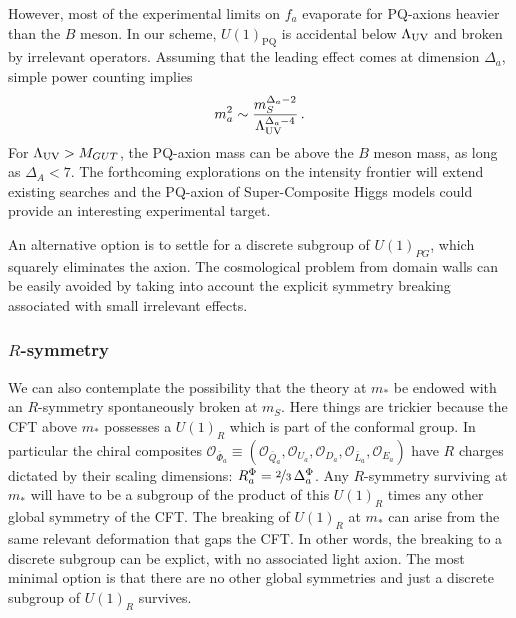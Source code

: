 \documentclass[a4paper,12pt]{article}
\newcommand{\be}{\begin{equation}}
\newcommand{\ee}{\end{equation}}
\def\O{\mathcal{O}}
\def\LUV{\Lambda_{\rm UV}}
\def\mS{m_S}
\begin{document}
{{{{However, most of the experimental limits on $f_a$ evaporate for PQ-axions heavier than the $B$ meson. In our scheme, $U(1)_{\textrm{PQ}}$ is accidental
below $\LUV$ and broken by irrelevant operators. Assuming that the leading effect comes  at dimension  $\Delta_{a}$, simple power counting implies 
\be
m_a^2 \sim \frac{\mS^{\Delta_a-2}}{\LUV^{\Delta_a-4}}\, .
\ee
For $\LUV> M_{GUT}$, the PQ-axion mass can be above the $B$ meson mass, as long as
$\Delta_A< 7$. The forthcoming explorations on the intensity frontier will extend existing searches and the PQ-axion of Super-Composite Higgs models could provide an interesting experimental target.

An alternative option is to settle for a discrete subgroup of $U(1)_{PG}$, which squarely eliminates the axion. The cosmological problem from domain walls can be easily avoided by taking into account the explicit symmetry breaking associated with small irrelevant effects.

\boldmath
 \subsubsection*{$R$-symmetry} 
 \unboldmath
 
We can also contemplate the possibility that the theory at $m_*$ be endowed with an $R$-symmetry spontaneously broken at $m_S$. Here things are trickier because the CFT above 
$m_*$ possesses a $U(1)_R$ which is part of the conformal group. In particular the chiral composites $\O_{{\bar \Phi}_a}\equiv (\O_{{\bar Q}_a},\O_{{U}_a},\O_{{D}_a}, \O_{{\bar L}_a}, \O_{{E}_a})$ have $R$ charges dictated by their scaling dimensions: $R^\Phi_a =\nicefrac{2}{3}\, \Delta^\Phi_a $. Any $R$-symmetry surviving at $m_*$ will have to be a subgroup of the product of this $U(1)_R$ times any other global symmetry of the CFT. The breaking of $U(1)_R$  at $m_*$ can arise from the same relevant deformation that gaps the CFT. In other words, the breaking to a discrete subgroup can be explict, with no associated light axion.
The most minimal option is that there are no other global symmetries and just a discrete subgroup of $U(1)_R$ survives. 

}}}}
\end{document}
